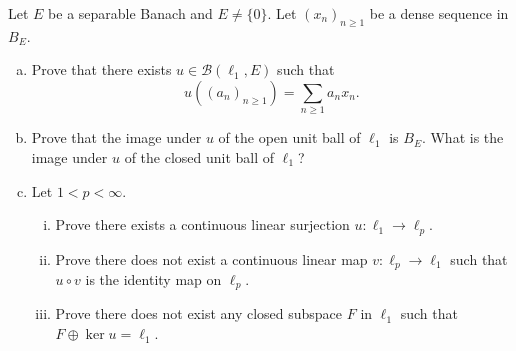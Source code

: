 \begin{exercise}[18]
  Let $E$ be a separable Banach and $E\neq \{0\}$.
  Let $(x_n)_{n\geq 1}$ be a dense sequence in $B_E$.
  \begin{enumerate}[(a)]
    \item Prove that there exists $u\in \mathcal{B}(\ell_1, E)$ such that
      \[u((a_n)_{n\geq 1}) = \sum_{n\geq 1} a_n x_n.\]
    \item Prove that the image under $u$ of the open unit ball of $\ell_1$ is $B_E$.
      What is the image under $u$ of the closed unit ball of $\ell_1$?
    \item Let $1<p<\infty$.
      \begin{enumerate}[(i)]
        \item Prove there exists a continuous linear surjection $u: \ell_1\to \ell_p$.
        \item Prove there does not exist a continuous linear map $v:\ell_p\to \ell_1$
          such that $u\circ v$ is the identity map on $\ell_p$.
        \item Prove there does not exist any closed subspace $F$ in $\ell_1$ such that
          $F\oplus \ker u = \ell_1$.
      \end{enumerate}
  \end{enumerate}
\end{exercise}

